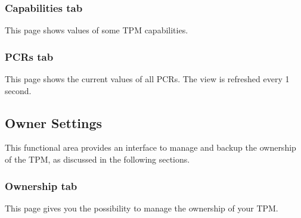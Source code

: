 \documentclass[
  american        %
]{sirrixreport}
\begin{document}
\subsubsection{Capabilities tab} This page shows values of some TPM capabilities.

\subsubsection{PCRs tab} This page shows the current values of all PCRs. The view is refreshed every 1 second.

\subsection{Owner Settings} This functional area provides an interface to manage and backup the ownership of the TPM, as discussed in the following sections. 

\subsubsection{Ownership tab} This page gives you the possibility to manage the ownership of your TPM.
\end{document}
